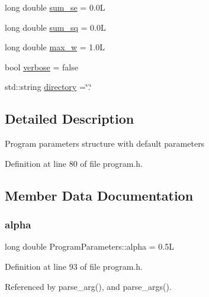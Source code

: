 \begin{DoxyCompactItemize}
\item 
long double \hyperlink{structProgramParameters_aa1eb9e78cc416055fb0e4a34d06a9e92}{sum\+\_\+se} = 0.\+0L
\item 
long double \hyperlink{structProgramParameters_a94e83f064575a4e4974b08d6e77b7d11}{sum\+\_\+sq} = 0.\+0L
\item 
long double \hyperlink{structProgramParameters_ad8e44b2101be1bc8469473b96d799161}{max\+\_\+w} = 1.\+0L
\item 
bool \hyperlink{structProgramParameters_a1fbe41b908139a22638722a607ebd354}{verbose} = false
\item 
std\+::string \hyperlink{structProgramParameters_a3e9a6456e4939907d955e76624cee398}{directory} =\char`\"{}.\char`\"{}
\end{DoxyCompactItemize}


\subsection{Detailed Description}
Program parameters structure with default parameters 

Definition at line 80 of file program.\+h.



\subsection{Member Data Documentation}
\mbox{\label{structProgramParameters_aa1e71492353d64a9617447f5a5465dd2}} 
\subsubsection{\texorpdfstring{alpha}{alpha}}
{\footnotesize\ttfamily long double Program\+Parameters\+::alpha = 0.\+5L}



Definition at line 93 of file program.\+h.



Referenced by parse\+\_\+arg(), and parse\+\_\+args().

\mbox{\label{structProgramParameters_a3e9a6456e4939907d955e76624cee398}} 
